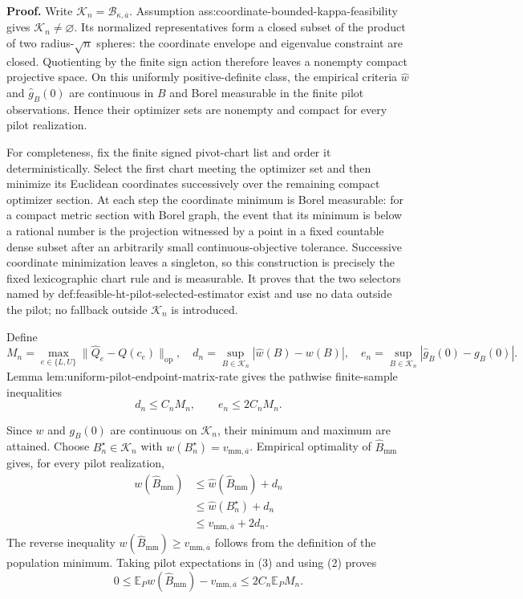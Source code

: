 \textbf{Proof.}
Write \(\mathcal K_n=\mathcal B_{\kappa,\overline a}\).  Assumption ass:coordinate-bounded-kappa-feasibility gives \(\mathcal K_n\ne\varnothing\).  Its normalized representatives form a closed subset of the product of two radius-\(\sqrt n\) spheres: the coordinate envelope and eigenvalue constraint are closed.  Quotienting by the finite sign action therefore leaves a nonempty compact projective space.  On this uniformly positive-definite class, the empirical criteria \(\widehat w\) and \(\widehat g_B(0)\) are continuous in \(B\) and Borel measurable in the finite pilot observations.  Hence their optimizer sets are nonempty and compact for every pilot realization.

For completeness, fix the finite signed pivot-chart list and order it deterministically.  Select the first chart meeting the optimizer set and then minimize its Euclidean coordinates successively over the remaining compact optimizer section.  At each step the coordinate minimum is Borel measurable: for a compact metric section with Borel graph, the event that its minimum is below a rational number is the projection witnessed by a point in a fixed countable dense subset after an arbitrarily small continuous-objective tolerance.  Successive coordinate minimization leaves a singleton, so this construction is precisely the fixed lexicographic chart rule and is measurable.  It proves that the two selectors named by def:feasible-ht-pilot-selected-estimator exist and use no data outside the pilot; no fallback outside \(\mathcal K_n\) is introduced.

Define
\[
 M_n=\max_{e\in\{L,U\}}
 \lVert\widehat Q_e-Q(c_e)\rVert_{\mathrm{op}},
 \quad
 d_n=\sup_{B\in\mathcal K_n}|\widehat w(B)-w(B)|,
 \quad
 e_n=\sup_{B\in\mathcal K_n}|\widehat g_B(0)-g_B(0)|.
 \tag{1}
\]
Lemma lem:uniform-pilot-endpoint-matrix-rate gives the pathwise finite-sample inequalities
\[
 d_n\leq C_nM_n,
 \qquad
 e_n\leq2C_nM_n.
 \tag{2}
\]

Since \(w\) and \(g_B(0)\) are continuous on \(\mathcal K_n\), their minimum and maximum are attained.  Choose \(B_n^\star\in\mathcal K_n\) with \(w(B_n^\star)=v_{\mathrm{mm},\overline a}\).  Empirical optimality of \(\widehat B_{\mathrm{mm}}\) gives, for every pilot realization,
\[
 \begin{aligned}
 w(\widehat B_{\mathrm{mm}})
 &\leq\widehat w(\widehat B_{\mathrm{mm}})+d_n\\
 &\leq\widehat w(B_n^\star)+d_n\\
 &\leq v_{\mathrm{mm},\overline a}+2d_n.
 \end{aligned}
 \tag{3}
\]
The reverse inequality \(w(\widehat B_{\mathrm{mm}})\geq v_{\mathrm{mm},\overline a}\) follows from the definition of the population minimum.  Taking pilot expectations in (3) and using (2) proves
\[
 0\leq
 \mathbb E_Pw(\widehat B_{\mathrm{mm}})-v_{\mathrm{mm},\overline a}
 \leq2C_n\mathbb E_PM_n.
 \tag{4}
\]

